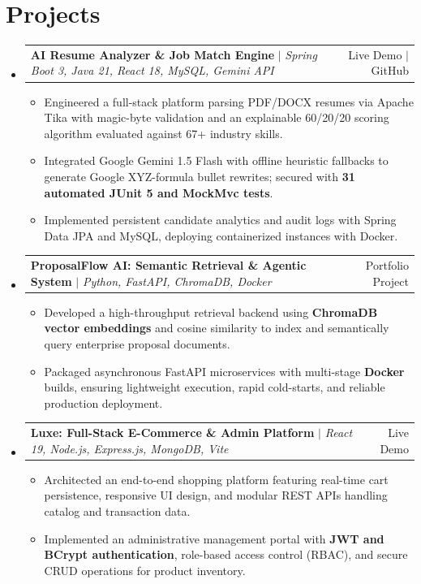 \documentclass[letterpaper,10pt]{article}
\makeatletter
\newcommand{\resumeItem}[1]{
  \item\small{
    {#1 \vspace{-2pt}}
  }
}
\newcommand{\resumeProjectHeading}[2]{
    \vspace{-2pt}\item
    \begin{tabular*}{0.98\textwidth}{l@{\extracolsep{\fill}}r}
      \small#1 & #2 \\
    \end{tabular*}\vspace{-4pt}
}
\newcommand{\resumeSubHeadingListStart}{\begin{itemize}[leftmargin=0.15in, label={}]}
\newcommand{\resumeSubHeadingListEnd}{\end{itemize}}
\newcommand{\resumeItemListStart}{\begin{itemize}[leftmargin=0.15in]}
\newcommand{\resumeItemListEnd}{\end{itemize}\vspace{-3pt}}
\makeatother
\begin{document}
\section{Projects}
    \resumeSubHeadingListStart
      \resumeProjectHeading
          {\textbf{AI Resume Analyzer \& Job Match Engine} $|$ \emph{Spring Boot 3, Java 21, React 18, MySQL, Gemini API}}{Live Demo $|$ GitHub}
          \resumeItemListStart
            \resumeItem{Engineered a full-stack platform parsing PDF/DOCX resumes via Apache Tika with magic-byte validation and an explainable 60/20/20 scoring algorithm evaluated against 67+ industry skills.}
            \resumeItem{Integrated Google Gemini 1.5 Flash with offline heuristic fallbacks to generate Google XYZ-formula bullet rewrites; secured with \textbf{31 automated JUnit 5 and MockMvc tests}.}
            \resumeItem{Implemented persistent candidate analytics and audit logs with Spring Data JPA and MySQL, deploying containerized instances with Docker.}
          \resumeItemListEnd

      \resumeProjectHeading
          {\textbf{ProposalFlow AI: Semantic Retrieval \& Agentic System} $|$ \emph{Python, FastAPI, ChromaDB, Docker}}{Portfolio Project}
          \resumeItemListStart
            \resumeItem{Developed a high-throughput retrieval backend using \textbf{ChromaDB vector embeddings} and cosine similarity to index and semantically query enterprise proposal documents.}
            \resumeItem{Packaged asynchronous FastAPI microservices with multi-stage \textbf{Docker} builds, ensuring lightweight execution, rapid cold-starts, and reliable production deployment.}
          \resumeItemListEnd

      \resumeProjectHeading
          {\textbf{Luxe: Full-Stack E-Commerce \& Admin Platform} $|$ \emph{React 19, Node.js, Express.js, MongoDB, Vite}}{Live Demo}
          \resumeItemListStart
            \resumeItem{Architected an end-to-end shopping platform featuring real-time cart persistence, responsive UI design, and modular REST APIs handling catalog and transaction data.}
            \resumeItem{Implemented an administrative management portal with \textbf{JWT and BCrypt authentication}, role-based access control (RBAC), and secure CRUD operations for product inventory.}
          \resumeItemListEnd
    \resumeSubHeadingListEnd

\end{document}
